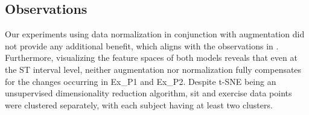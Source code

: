 \subsection{Observations}
Our experiments using data normalization in conjunction with augmentation did not provide any additional benefit, which aligns with the observations in .
Furthermore, visualizing the feature spaces of both models reveals that even at the ST interval level, neither augmentation nor normalization fully compensates for the changes occurring in Ex\_P1 and Ex\_P2.
Despite t-SNE being an unsupervised dimensionality reduction algorithm, sit and exercise data points were clustered separately, with each subject having at least two clusters.
